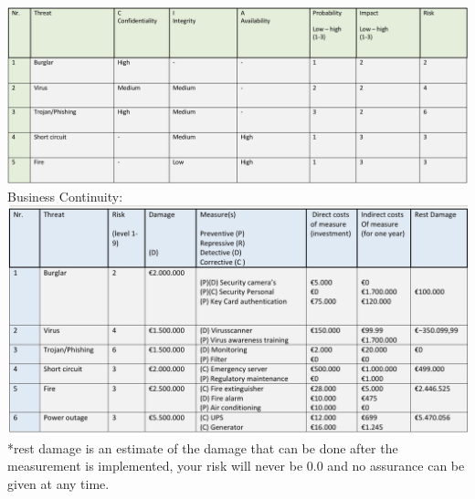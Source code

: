 \documentclass[12pt, letterpaper]{article}
\begin{document}
\includegraphics[width=1.1\textwidth]{fotos/Bok week 1/Riskanalysis.jpeg}
\break
Business Continuity: 
\hfill\break
\includegraphics[width=1.1\textwidth]{fotos/Bok week 1/Riskanalysis2.jpeg}
\break
*rest damage is an estimate of the damage that can be done after the measurement is implemented, your risk will never be 0.0 and no assurance can be given at any time.
\break
\newpage
\end{document}
